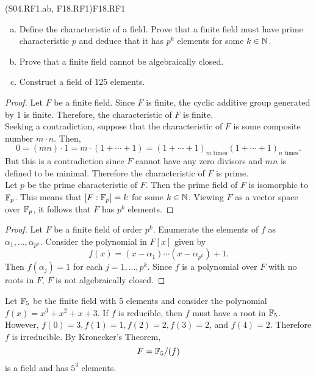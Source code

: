 \documentclass[../../AlgebraQualSolutions.tex]{subfiles}
\begin{document}
\begin{prob}{(S04.RF1.ab, F18.RF1)}{F18.RF1}
	\begin{enumerate}[(a)]
		\item Define the characteristic of a field. Prove that a finite field must have prime characteristic $p$ and deduce that it has $p^k$ elements for some $k \in \mathbb{N}$.
		\item Prove  that a finite field cannot be algebraically closed.
		\item Construct a field of 125 elements.
	\end{enumerate}
\end{prob}

\begin{proof}
	Let $F$ be a finite field. Since $F$ is finite, the cyclic additive  group generated by 1 is finite. Therefore, the characteristic of $F$ is finite.\\
	
	Seeking a contradiction, suppose that the characteristic of $F$ is some composite number $m\cdot n$. Then,
		\[0 = (mn)\cdot 1 = m\cdot (1 + \cdots + 1) = (1 + \cdots + 1)_{\textrm{$m$ times}} (1 + \cdots + 1)_{\textrm{$n$ times}}.\]
	But this is a contradiction since $F$ cannot have any zero divisors and $mn$ is defined to be minimal. Therefore the characteristic of $F$ is prime.\\

	Let $p$ be the prime characteristic of $F$. Then the prime field of $F$ is isomorphic to $\mathbb{F}_p$. This means that $[F: \mathbb{F}_p] = k$ for some $k \in \mathbb{N}$. Viewing $F$ as a vector space over $\mathbb{F}_p$, it follows that $F$ has $p^k$ elements.
\end{proof}

\begin{proof}
	Let $F$ be a  finite field of order $p^k$. Enumerate the elements of $f$ as $\alpha_1,\ldots, \alpha_{p^k}$. Consider the polynomial in $F[x]$ given by 
		\[f(x) = (x-\alpha_1)\cdots (x-\alpha_{p^k}) + 1.\]
	Then $f(\alpha_j) = 1$ for each $j = 1,\ldots,p^k$. Since $f$ is a polynomial over $F$ with no roots in $F$, $F$ is not algebraically closed.
\end{proof}

\begin{solution}
	Let $\mathbb{F}_5$ be the finite field with 5 elements and consider the polynomial $f(x) = x^3 + x^2 + x + 3$. If $f$ is reducible, then $f$ must have a root in $\mathbb{F}_5$. However, $f(0) = 3, f(1) = 1, f(2) = 2, f(3) = 2$, and $f(4) = 2$. Therefore $f$ is irreducible. By Kronecker's Theorem,
		\[F = \mathbb{F}_5/(f)\]
	is a field and has $5^3$ elements.
\end{solution}
\end{document}
